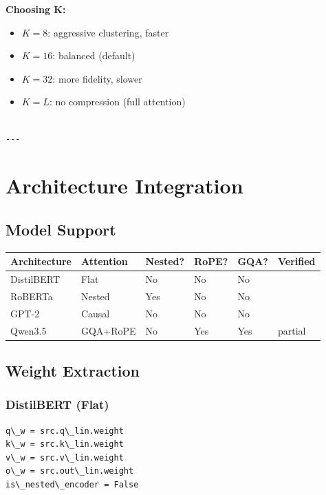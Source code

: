 \textbf{Choosing K:}

\begin{itemize}
\item $K = 8$: aggressive clustering, faster
\item $K = 16$: balanced (default)
\item $K = 32$: more fidelity, slower
\item $K = L$: no compression (full attention)
\end{itemize}
\begin{lstlisting}

---
\end{lstlisting}

\section{Architecture Integration}

\subsection{Model Support}

\begin{table}[H]
\centering
\small
\begin{tabular}{llllll}
\toprule
\textbf{Architecture} & \textbf{Attention} & \textbf{Nested?} & \textbf{RoPE?} & \textbf{GQA?} & \textbf{Verified} \\
\midrule
DistilBERT & Flat & No & No & No &  \\
RoBERTa & Nested & Yes & No & No &  \\
GPT-2 & Causal & No & No & No &  \\
Qwen3.5 & GQA+RoPE & No & Yes & Yes & partial \\
\bottomrule
\end{tabular}
\end{table}

\subsection{Weight Extraction}

\subsubsection{DistilBERT (Flat)}
\begin{lstlisting}
q\_w = src.q\_lin.weight
k\_w = src.k\_lin.weight
v\_w = src.v\_lin.weight
o\_w = src.out\_lin.weight
is\_nested\_encoder = False
\end{lstlisting}

